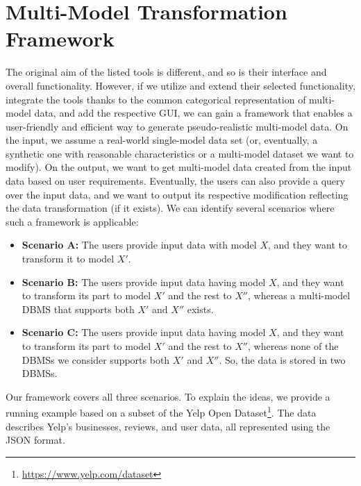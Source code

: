 \section{Multi-Model Transformation Framework}
The original aim of the listed tools is different, and so is their interface and overall functionality. However, if we utilize and extend their selected functionality, integrate the tools thanks to the common categorical representation of multi-model data, and add the respective GUI, we can gain a framework that enables a user-friendly and efficient way to generate pseudo-realistic multi-model data. On the input, we assume a real-world single-model data set (or, eventually, a synthetic one with reasonable characteristics or a multi-model dataset we want to modify). On the output, we want to get multi-model data created from the input data based on user requirements. Eventually, the users can also provide a query over the input data, and we want to output its respective modification reflecting the data transformation (if it exists). We can identify several scenarios where such a framework is applicable:

\begin{itemize}
    \item \textbf{Scenario A:} The users provide input data with model $X$, and they want to transform it to model $X'$. 
    \item \textbf{Scenario B:} The users provide input data having model $X$, and they want to transform its part to model $X'$ and the rest to $X''$, whereas a multi-model DBMS that supports both $X'$ and $X''$ exists.
    \item \textbf{Scenario C:} The users provide input data having model $X$, and they want to transform its part to model $X'$ and the rest to $X''$, whereas none of the DBMSs we consider supports both $X'$ and $X''$. So, the data is stored in two DBMSs.
\end{itemize}

Our framework covers all three scenarios. To explain the ideas, we provide a running example based on a subset of the Yelp Open Dataset\footnote{\url{https://www.yelp.com/dataset}}. The data describes Yelp's businesses, reviews, and user data, all represented using the JSON format. 

